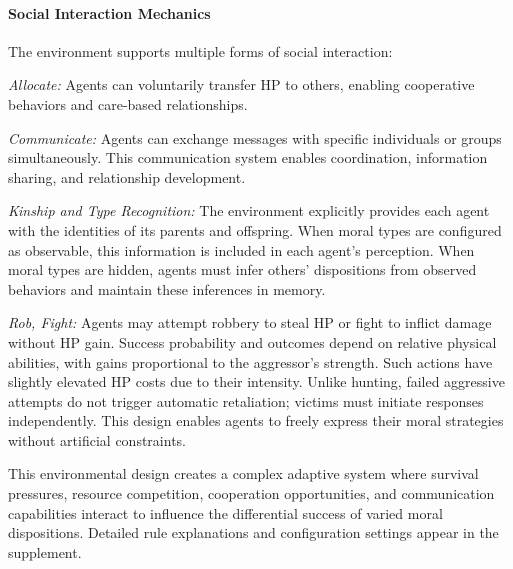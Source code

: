 \paragraph{Social Interaction Mechanics}
The environment supports multiple forms of social interaction:

\textit{Allocate:} Agents can voluntarily transfer HP to others, enabling cooperative behaviors and care-based relationships.

\textit{Communicate:} Agents can exchange messages with specific individuals or groups simultaneously. This communication system enables coordination, information sharing, and relationship development.

\textit{Kinship and Type Recognition:} The environment explicitly provides each agent with the identities of its parents and offspring. When moral types are configured as observable, this information is included in each agent's perception. When moral types are hidden, agents must infer others' dispositions from observed behaviors and maintain these inferences in memory.


\textit{Rob, Fight:} Agents may attempt robbery to steal HP or fight to inflict damage without HP gain. Success probability and outcomes depend on relative physical abilities, with gains proportional to the aggressor’s strength. Such actions have slightly elevated HP costs due to their intensity. Unlike hunting, failed aggressive attempts do not trigger automatic retaliation; victims must initiate responses independently. This design enables agents to freely express their moral strategies without artificial constraints.

This environmental design creates a complex adaptive system where survival pressures, resource competition, cooperation opportunities, and communication capabilities interact to influence the differential success of varied moral dispositions. Detailed rule explanations and configuration settings appear in the supplement.


